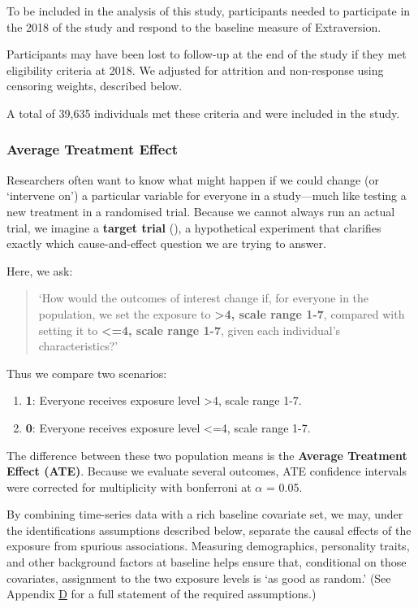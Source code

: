 \documentclass[
  single column]{article}
\providecommand{\tightlist}{%
  \setlength{\itemsep}{0pt}\setlength{\parskip}{0pt}}
\begin{document}
To be included in the analysis of this study, participants needed to
participate in the 2018 of the study and respond to the baseline measure
of Extraversion.

Participants may have been lost to follow-up at the end of the study if
they met eligibility criteria at 2018. We adjusted for attrition and
non-response using censoring weights, described below.

A total of 39,635 individuals met these criteria and were included in
the study.

\subsubsection{Average Treatment Effect}\label{average-treatment-effect}

Researchers often want to know what might happen if we could change (or
`intervene on') a particular variable for everyone in a study---much
like testing a new treatment in a randomised trial. Because we cannot
always run an actual trial, we imagine a \textbf{target trial}
(), a hypothetical
experiment that clarifies exactly which cause-and-effect question we are
trying to answer.

Here, we ask:

\begin{quote}
`How would the outcomes of interest change if, for everyone in the
population, we set the exposure to \textbf{\textgreater4, scale range
1-7}, compared with setting it to \textbf{\textless=4, scale range 1-7},
given each individual's characteristics?'
\end{quote}

Thus we compare two scenarios:

\begin{enumerate}
\def\labelenumi{\arabic{enumi}.}
\tightlist
\item
  \textbf{1}: Everyone receives exposure level \textgreater4, scale
  range 1-7.
\item
  \textbf{0}: Everyone receives exposure level \textless=4, scale range
  1-7.
\end{enumerate}

The difference between these two population means is the \textbf{Average
Treatment Effect (ATE)}. Because we evaluate several outcomes, ATE
confidence intervals were corrected for multiplicity with bonferroni at
\(\alpha\) = 0.05.

By combining time-series data with a rich baseline covariate set, we
may, under the identifications assumptions described below, separate the
causal effects of the exposure from spurious associations. Measuring
demographics, personality traits, and other background factors at
baseline helps ensure that, conditional on those covariates, assignment
to the two exposure levels is `as good as random.' (See Appendix
\hyperref[appendix-assumptions_grf]{D} for a full statement of the
required assumptions.)
\end{document}
